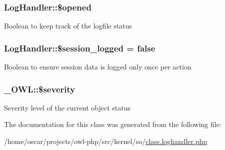 \subsubsection[{\$opened}]{\setlength{\rightskip}{0pt plus 5cm}LogHandler::\$opened}\label{classLogHandler_a956e7e71a9ff96c6301d1f41a5bf207e}
Boolean to keep track of the logfile status 
\subsubsection[{\$session\_\-logged}]{\setlength{\rightskip}{0pt plus 5cm}LogHandler::\$session\_\-logged = false}\label{classLogHandler_a0cfee82e814e8f258349710b6e87b72b}
Boolean to ensure session data is logged only once per action 
\subsubsection[{\$severity}]{\setlength{\rightskip}{0pt plus 5cm}\_\-OWL::\$severity}\label{class__OWL_ad26b40a9dbbacb33e299b17826f8327c}
Severity level of the current object status 

The documentation for this class was generated from the following file:\begin{DoxyCompactItemize}
\item 
/home/oscar/projects/owl-\/php/src/kernel/so/\hyperlink{class_8loghandler_8php}{class.loghandler.php}\end{DoxyCompactItemize}
